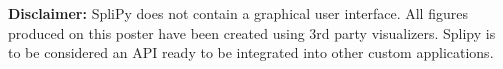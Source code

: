 \documentclass[landscape]{sintefposter}
\begin{document}
\begin{multicols}{3}
\begin{minipage}[b]{\linewidth}
\scriptsize
\textbf{Disclaimer:}
SpliPy does not contain a graphical user interface.
All figures produced on this poster have been created using 3rd party visualizers.
Splipy is to be considered an API ready to be integrated into other custom applications.
\end{minipage}


\end{multicols}
\end{document}
